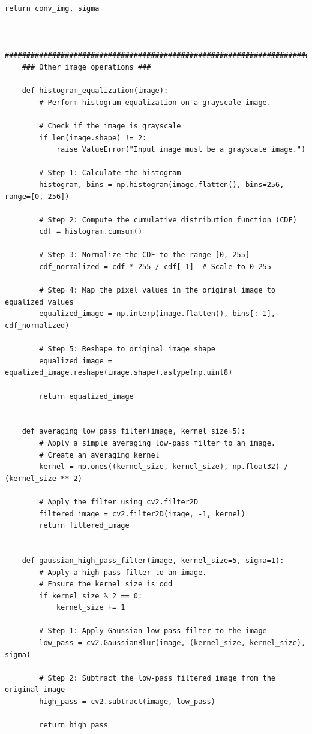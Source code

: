 \documentclass[11pt, conference, letterpaper]{IEEEtran}
\begin{document}
\begin{lstlisting}[style=python, caption={\texttt{image\_utils.py}}, label={lst:iutils}]
        return conv_img, sigma
    
    
    ##########################################################################################
    ### Other image operations ###
    
    def histogram_equalization(image):
        # Perform histogram equalization on a grayscale image.
    
        # Check if the image is grayscale
        if len(image.shape) != 2:
            raise ValueError("Input image must be a grayscale image.")
    
        # Step 1: Calculate the histogram
        histogram, bins = np.histogram(image.flatten(), bins=256, range=[0, 256])
    
        # Step 2: Compute the cumulative distribution function (CDF)
        cdf = histogram.cumsum()
    
        # Step 3: Normalize the CDF to the range [0, 255]
        cdf_normalized = cdf * 255 / cdf[-1]  # Scale to 0-255
    
        # Step 4: Map the pixel values in the original image to equalized values
        equalized_image = np.interp(image.flatten(), bins[:-1], cdf_normalized)
    
        # Step 5: Reshape to original image shape
        equalized_image = equalized_image.reshape(image.shape).astype(np.uint8)
    
        return equalized_image
    
    
    def averaging_low_pass_filter(image, kernel_size=5):
        # Apply a simple averaging low-pass filter to an image.
        # Create an averaging kernel
        kernel = np.ones((kernel_size, kernel_size), np.float32) / (kernel_size ** 2)
    
        # Apply the filter using cv2.filter2D
        filtered_image = cv2.filter2D(image, -1, kernel)
        return filtered_image
    
    
    def gaussian_high_pass_filter(image, kernel_size=5, sigma=1):
        # Apply a high-pass filter to an image.
        # Ensure the kernel size is odd
        if kernel_size % 2 == 0:
            kernel_size += 1
        
        # Step 1: Apply Gaussian low-pass filter to the image
        low_pass = cv2.GaussianBlur(image, (kernel_size, kernel_size), sigma)
        
        # Step 2: Subtract the low-pass filtered image from the original image
        high_pass = cv2.subtract(image, low_pass)
        
        return high_pass
\end{lstlisting}
\end{document}
